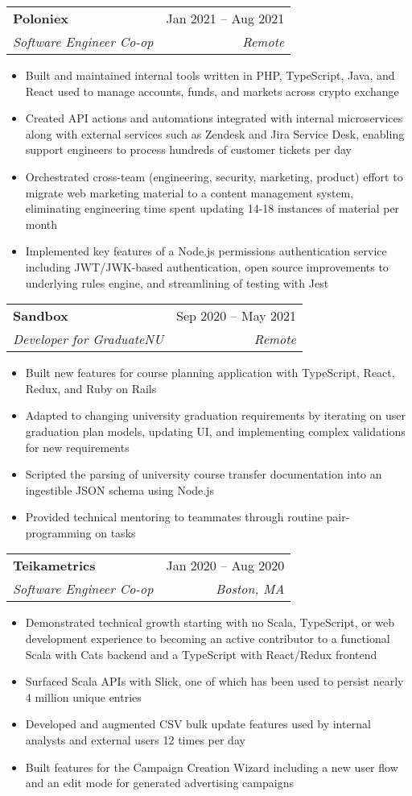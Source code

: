 \documentclass[letterpaper, 11pt]{article}
\makeatletter
\newcommand{\resumeItem}[1]{
  \item\small{
    {#1 \vspace{-2pt}}
  }
}
\newcommand{\resumeSubheading}[4]{
  \vspace{-2pt}\item
    \begin{tabular*}{0.97\textwidth}[t]{l@{\extracolsep{\fill}}r}
      \textbf{#1} & #2 \\
     \textit{\small#3} &  \textit{\small#4} \\
    \end{tabular*}\vspace{-7pt}
}
\newcommand{\resumeItemListStart}{\begin{itemize}}
\newcommand{\resumeItemListEnd}{\end{itemize}\vspace{-5pt}}
\makeatother
\begin{document}
        \resumeSubheading
            {Poloniex}{Jan 2021 -- Aug 2021}{Software Engineer Co-op}{Remote}
            \resumeItemListStart
                \resumeItem{Built and maintained internal tools written in PHP, TypeScript, Java, and React used to manage accounts, funds, and markets across crypto exchange}
                \resumeItem{Created API actions and automations integrated with internal microservices along with external services such as Zendesk and Jira Service Desk, enabling support engineers to process hundreds of customer tickets per day}
                \resumeItem{Orchestrated cross-team (engineering, security, marketing, product) effort to migrate web marketing material to a content management system, eliminating engineering time spent updating 14-18 instances of material per month}
                \resumeItem{Implemented key features of a Node.js permissions authentication service including JWT/JWK-based authentication, open source improvements to underlying rules engine, and streamlining of testing with Jest}
            \resumeItemListEnd
            
        \resumeSubheading
            {Sandbox}{Sep 2020 -- May 2021}{Developer for GraduateNU}{Remote}
            \resumeItemListStart
                \resumeItem{Built new features for course planning application with TypeScript, React, Redux, and Ruby on Rails}
                \resumeItem{Adapted to changing university graduation requirements by iterating on user graduation plan models, updating UI, and implementing complex validations for new requirements}
                \resumeItem{Scripted the parsing of university course transfer documentation into an ingestible JSON schema using Node.js}
                \resumeItem{Provided technical mentoring to teammates through routine pair-programming on tasks}
            \resumeItemListEnd
            
        \resumeSubheading
            {Teikametrics}{Jan 2020 -- Aug 2020}{Software Engineer Co-op}{Boston, MA}
            \resumeItemListStart
                \resumeItem{Demonstrated technical growth starting with no Scala, TypeScript, or web development experience to becoming an active contributor to a functional Scala with Cats backend and a TypeScript with React/Redux frontend}
                \resumeItem{Surfaced Scala APIs with Slick, one of which has been used to persist nearly 4 million unique entries}
                \resumeItem{Developed and augmented CSV bulk update features used by internal analysts and external users 12 times per day}
                \resumeItem{Built features for the Campaign Creation Wizard including a new user flow and an edit mode for generated advertising campaigns}
            \resumeItemListEnd        
\end{document}
